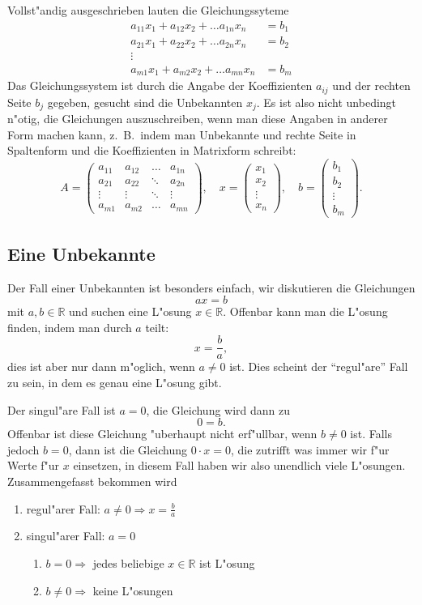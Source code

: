 Vollst"andig ausgeschrieben lauten die Gleichungssyteme
\begin{align*}
a_{11}x_1+a_{12}x_2+\dots a_{1n}x_n&=b_1\\
a_{21}x_1+a_{22}x_2+\dots a_{2n}x_n&=b_2\\
\vdots\\
a_{m1}x_1+a_{m2}x_2+\dots a_{mn}x_n&=b_m
\end{align*}
Das Gleichungssystem ist durch die Angabe der Koeffizienten $a_{ij}$
und der rechten Seite $b_j$ gegeben, gesucht sind die Unbekannten $x_j$.
Es ist also nicht unbedingt n"otig, die Gleichungen auszuschreiben,
wenn man diese Angaben in anderer Form machen kann, z.~B.~indem man
Unbekannte und rechte Seite in Spaltenform und die Koeffizienten in
Matrixform schreibt:
\[
A=\begin{pmatrix}
a_{11}&a_{12}&\dots &a_{1n}\\
a_{21}&a_{22}&\ddots&a_{2n}\\
\vdots&\vdots&\ddots&\vdots\\
a_{m1}&a_{m2}&\dots&a_{mn}
\end{pmatrix}
,\quad
x=\begin{pmatrix}
x_1\\x_2\\\vdots\\x_n
\end{pmatrix},
\quad
b=\begin{pmatrix}
b_1\\b_2\\\vdots\\b_m
\end{pmatrix}.
\]

\subsection{Eine Unbekannte}
Der Fall einer Unbekannten ist besonders einfach, wir diskutieren die
Gleichungen
\[
ax=b
\]
mit $a,b\in\mathbb R$ und suchen eine L"osung $x\in\mathbb R$.
Offenbar kann man die L"osung finden, indem man durch $a$ teilt:
\[
x=\frac{b}{a},
\]
dies ist aber nur dann m"oglich, wenn $a\ne 0$ ist.
Dies scheint
der ``regul"are'' Fall zu sein, in dem es genau eine L"osung gibt.

Der singul"are Fall ist $a=0$, die Gleichung wird dann zu 
\[
0=b.
\]
Offenbar ist diese Gleichung "uberhaupt nicht erf"ullbar, wenn $b\ne 0$
ist.
Falls jedoch $b=0$, dann ist die Gleichung $0\cdot x=0$, die
zutrifft was immer wir f"ur Werte f"ur $x$ einsetzen, in diesem
Fall haben wir also unendlich viele L"osungen.
Zusammengefasst
bekommen wird
\begin{enumerate}
\item regul"arer Fall: $a\ne 0\Rightarrow x=\frac{b}{a}$
\item singul"arer Fall: $a=0$
\begin{enumerate}
\item $b=0\Rightarrow$ jedes beliebige $x\in\mathbb R$ ist L"osung
\item $b\ne0\Rightarrow$ keine L"osungen
\end{enumerate}
\end{enumerate}

